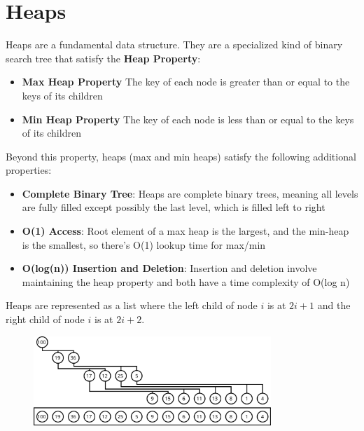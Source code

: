 \documentclass[12pt]{article}
\begin{document}
\section{Heaps}
Heaps are a fundamental data structure. They are a specialized kind of binary search tree that satisfy the \textbf{Heap Property}:
\begin{itemize}
\item \textbf{Max Heap Property} The key of each node is greater than or equal to the keys of its children
\item \textbf{Min Heap Property} The key of each node is less than or equal to the keys of its children
\end{itemize}
Beyond this property, heaps (max and min heaps) satisfy the following additional properties:
\begin{itemize}
\item \textbf{Complete Binary Tree}: Heaps are complete binary trees, meaning all levels are fully filled except possibly the last level, which is filled left to right
\item \textbf{O(1) Access}: Root element of a max heap is the largest, and the min-heap is the smallest, so there's O(1) lookup time for max/min
\item \textbf{O(log(n)) Insertion and Deletion}: Insertion and deletion involve maintaining the heap property and both have a time complexity of O(log n)
\end{itemize}

Heaps are represented as a list where the left child of node \(i\) is at \(2i+1\) and the right child of node \(i\) is at \(2i+2\).

\begin{figure}[H]
    \centering
    \includegraphics[width=0.8\textwidth]{./Heap-as-array.png} %
\end{figure}
\end{document}

